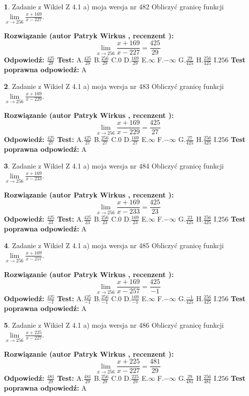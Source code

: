 \documentclass[12pt, a4paper]{article}
\theoremstyle{definition} %
\newtheorem{zad}{}
\newcommand{\zadStart}[1]{\begin{zad}#1\newline}
\newcommand{\zadStop}{\end{zad}}
\newcommand{\rozwStart}[2]{\noindent \textbf{Rozwiązanie (autor #1 , recenzent #2): }\newline}
\newcommand{\rozwStop}{\newline}
\newcommand{\odpStart}{\noindent \textbf{Odpowiedź:}\newline}
\newcommand{\odpStop}{\newline}
\newcommand{\testStart}{\noindent \textbf{Test:}\newline}
\newcommand{\testStop}{\newline}
\newcommand{\kluczStart}{\noindent \textbf{Test poprawna odpowiedź:}\newline}
\newcommand{\kluczStop}{\newline}
\begin{document}
\zadStart{Zadanie z Wikieł Z 4.1 a) moja wersja nr 482}
Obliczyć granicę funkcji $\lim\limits_{x\to256}\frac{x+169}{x-227}$.
\zadStop
\rozwStart{Patryk Wirkus}{}
$$\lim\limits_{x\to256}\frac{x+169}{x-227} = \frac{425}{29}$$
\rozwStop
\odpStart
$\frac{425}{29}$
\odpStop
\testStart
A.$\frac{425}{29}$
B.$\frac{256}{29}$
C.$0$
D.$\frac{169}{29}$
E.$\infty$
F.$-\infty$
G.$\frac{29}{425}$
H.$\frac{256}{425}$
I.$256$
\testStop
\kluczStart
A
\kluczStop



\zadStart{Zadanie z Wikieł Z 4.1 a) moja wersja nr 483}
Obliczyć granicę funkcji $\lim\limits_{x\to256}\frac{x+169}{x-229}$.
\zadStop
\rozwStart{Patryk Wirkus}{}
$$\lim\limits_{x\to256}\frac{x+169}{x-229} = \frac{425}{27}$$
\rozwStop
\odpStart
$\frac{425}{27}$
\odpStop
\testStart
A.$\frac{425}{27}$
B.$\frac{256}{27}$
C.$0$
D.$\frac{169}{27}$
E.$\infty$
F.$-\infty$
G.$\frac{27}{425}$
H.$\frac{256}{425}$
I.$256$
\testStop
\kluczStart
A
\kluczStop



\zadStart{Zadanie z Wikieł Z 4.1 a) moja wersja nr 484}
Obliczyć granicę funkcji $\lim\limits_{x\to256}\frac{x+169}{x-233}$.
\zadStop
\rozwStart{Patryk Wirkus}{}
$$\lim\limits_{x\to256}\frac{x+169}{x-233} = \frac{425}{23}$$
\rozwStop
\odpStart
$\frac{425}{23}$
\odpStop
\testStart
A.$\frac{425}{23}$
B.$\frac{256}{23}$
C.$0$
D.$\frac{169}{23}$
E.$\infty$
F.$-\infty$
G.$\frac{23}{425}$
H.$\frac{256}{425}$
I.$256$
\testStop
\kluczStart
A
\kluczStop



\zadStart{Zadanie z Wikieł Z 4.1 a) moja wersja nr 485}
Obliczyć granicę funkcji $\lim\limits_{x\to256}\frac{x+169}{x-257}$.
\zadStop
\rozwStart{Patryk Wirkus}{}
$$\lim\limits_{x\to256}\frac{x+169}{x-257} = \frac{425}{-1}$$
\rozwStop
\odpStart
$\frac{425}{-1}$
\odpStop
\testStart
A.$\frac{425}{-1}$
B.$\frac{256}{-1}$
C.$0$
D.$\frac{169}{-1}$
E.$\infty$
F.$-\infty$
G.$\frac{-1}{425}$
H.$\frac{256}{425}$
I.$256$
\testStop
\kluczStart
A
\kluczStop



\zadStart{Zadanie z Wikieł Z 4.1 a) moja wersja nr 486}
Obliczyć granicę funkcji $\lim\limits_{x\to256}\frac{x+225}{x-227}$.
\zadStop
\rozwStart{Patryk Wirkus}{}
$$\lim\limits_{x\to256}\frac{x+225}{x-227} = \frac{481}{29}$$
\rozwStop
\odpStart
$\frac{481}{29}$
\odpStop
\testStart
A.$\frac{481}{29}$
B.$\frac{256}{29}$
C.$0$
D.$\frac{225}{29}$
E.$\infty$
F.$-\infty$
G.$\frac{29}{481}$
H.$\frac{256}{481}$
I.$256$
\testStop
\kluczStart
A
\kluczStop
\end{document}
